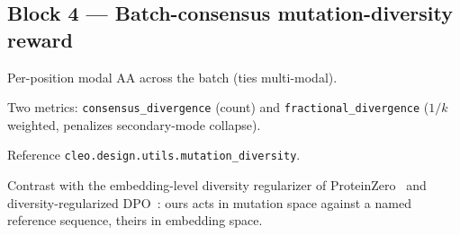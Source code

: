 \subsection*{Block 4 --- Batch-consensus mutation-diversity reward}
\begin{planlist}
  \item Per-position modal AA across the batch (ties multi-modal).
  \item Two metrics: \texttt{consensus\_divergence} (count) and
        \texttt{fractional\_divergence} ($1/k$ weighted, penalizes
        secondary-mode collapse).
  \item Reference \texttt{cleo.design.utils.mutation\_diversity}.
  \item Contrast with the embedding-level diversity regularizer of
        ProteinZero~\cite{wang2025proteinzero} and diversity-regularized
        DPO~\cite{park2024divdpo}: ours acts in mutation space against a
        named reference sequence, theirs in embedding space.
\end{planlist}
